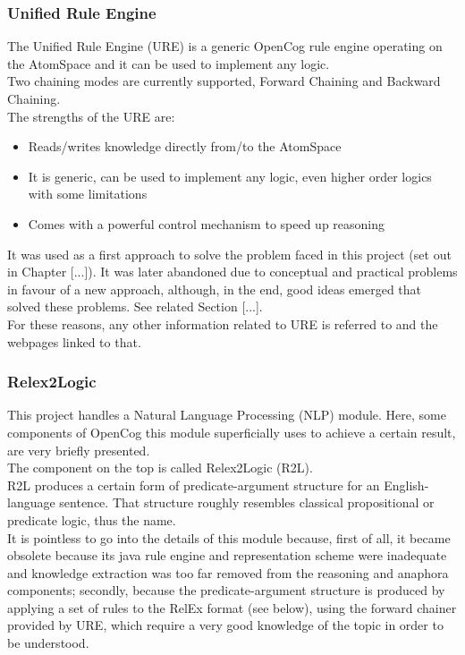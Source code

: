\subsubsection{Unified Rule Engine}\label{sec:ure}

The Unified Rule Engine (URE) is a generic OpenCog rule engine operating on the AtomSpace and it can be used to implement any logic. \\
Two chaining modes are currently supported, Forward Chaining and Backward Chaining. \\
The strengths of the URE are:
\begin{itemize}
	\item Reads/writes knowledge directly from/to the AtomSpace
	\item It is generic, can be used to implement any logic, even higher order logics with some limitations
	\item Comes with a powerful control mechanism to speed up reasoning
\end{itemize}

It was used as a first approach to solve the problem faced in this project (set out in Chapter [...]). It was later abandoned due to conceptual and practical problems in favour of a new approach, although, in the end, good ideas emerged that solved these problems. See related Section [...]. \\
For these reasons, any other information related to URE is referred to \cite{geisweiller_2019} and the webpages linked to that.

\subsubsection{Relex2Logic}\label{sec:r2l}

This project handles a Natural Language Processing (NLP) module. Here, some components of OpenCog this module superficially uses to achieve a certain result, are very briefly presented. \\
The component on the top is called Relex2Logic (R2L). \\
R2L produces a certain form of predicate-argument structure for an English-language sentence. That structure roughly resembles classical propositional or predicate logic, thus the name. \\
It is pointless to go into the details of this module because, first of all, it became obsolete because its java rule engine and representation scheme were inadequate and knowledge extraction was too far removed from the reasoning and anaphora components; secondly, because the predicate-argument structure is produced by applying a set of rules to the RelEx format (see below), using the forward chainer provided by URE, which require a very good knowledge of the topic in order to be understood. \\

